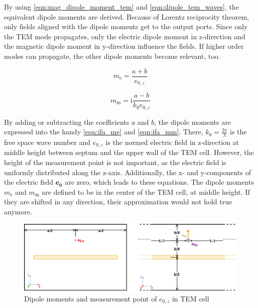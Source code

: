 
By using \autoref{eqn:mag_dipole_moment_tem} and \autoref{eqn:dipole_tem_waves}, the equivalent dipole moments are derived. Because of Lorentz reciprocity theorem, only fields aligned with the dipole moments get to the output ports. Since only the TEM mode propagates, only the electric dipole moment in z-direction and the magnetic dipole moment in y-direction influence the fields. If higher order modes can propagate, the other dipole moments become relevant, too.



\begin{equation}
    m_{\mathrm{e}}=\frac{a+b}{e_{0,z}}
    \label{eqn:ifa_me}
\end{equation}

\begin{equation}
    m_{\mathrm{m}}=\mathrm{i}\frac{a-b}{k_0  e_{0,z}}
    \label{eqn:ifa_mm}
\end{equation}

By adding or subtracting the coefficients $a$ and $b$, the dipole moments are expressed into the handy \autoref{eqn:ifa_me} and \autoref{eqn:ifa_mm}. There, $k_0=\frac{2\pi}{\lambda}$ is the free space wave number and $e_{0,z}$ is the normed electric field in z-direction at middle height between septum and the upper wall of the TEM cell. However, the height of the measurement point is not important, as the electric field is uniformly distributed along the z-axis. Additionally, the x- and y-components of the electric field $\mathbf{e_{0}}$ are zero, which leads to these equations. The dipole moments $m_{\mathrm{e}}$ and $m_{\mathrm{m}}$ are defined to be in the center of the TEM cell, at middle height. If they are shifted in any direction, their approximation would not hold true anymore.

\begin{figure}[h]
    \centering
    \includegraphics[width=1\linewidth]{content//30_simulations//img/sketch_dipoles_tem_cell.png}
    \caption{Dipole moments and measurement point of $e_{0,z}$ in TEM cell}
    \label{fig:sketch_dipoles_tem_cell}
\end{figure}

